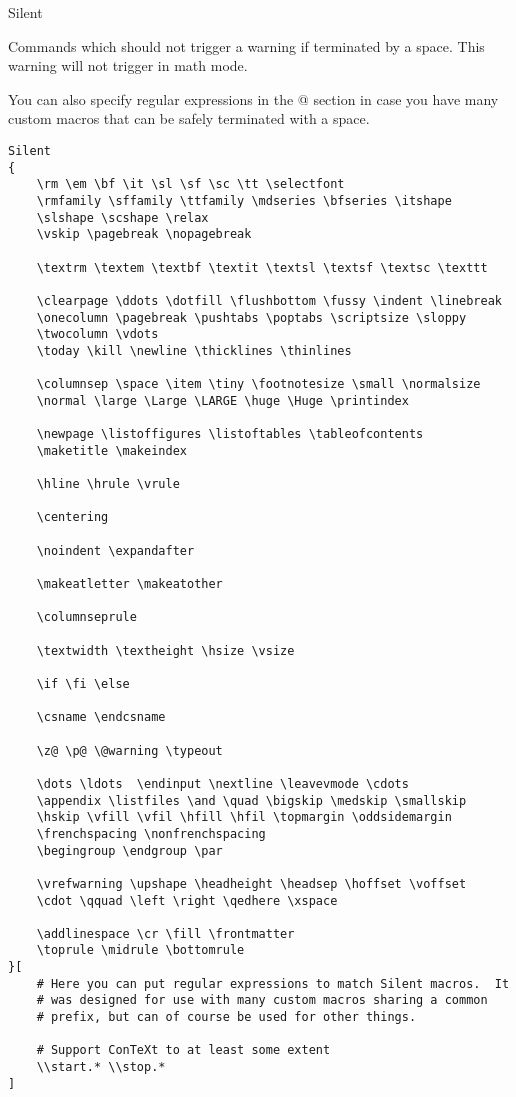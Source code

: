 \begin{chktexrclistvar*}{Silent}

Commands which should not trigger a warning if terminated by a space.
This warning will not trigger in math mode.

You can also specify regular expressions in the \verb@[]@
section in case you have many custom macros that can be safely
terminated with a space.

\chktexrcdefault\begin{verbatim}
Silent
{
    \rm \em \bf \it \sl \sf \sc \tt \selectfont
    \rmfamily \sffamily \ttfamily \mdseries \bfseries \itshape
    \slshape \scshape \relax
    \vskip \pagebreak \nopagebreak

    \textrm \textem \textbf \textit \textsl \textsf \textsc \texttt

    \clearpage \ddots \dotfill \flushbottom \fussy \indent \linebreak
    \onecolumn \pagebreak \pushtabs \poptabs \scriptsize \sloppy
    \twocolumn \vdots
    \today \kill \newline \thicklines \thinlines

    \columnsep \space \item \tiny \footnotesize \small \normalsize
    \normal \large \Large \LARGE \huge \Huge \printindex

    \newpage \listoffigures \listoftables \tableofcontents
    \maketitle \makeindex

    \hline \hrule \vrule

    \centering

    \noindent \expandafter

    \makeatletter \makeatother

    \columnseprule

    \textwidth \textheight \hsize \vsize

    \if \fi \else

    \csname \endcsname

    \z@ \p@ \@warning \typeout

    \dots \ldots  \endinput \nextline \leavevmode \cdots
    \appendix \listfiles \and \quad \bigskip \medskip \smallskip
    \hskip \vfill \vfil \hfill \hfil \topmargin \oddsidemargin
    \frenchspacing \nonfrenchspacing
    \begingroup \endgroup \par

    \vrefwarning \upshape \headheight \headsep \hoffset \voffset
    \cdot \qquad \left \right \qedhere \xspace

    \addlinespace \cr \fill \frontmatter
    \toprule \midrule \bottomrule
}[
    # Here you can put regular expressions to match Silent macros.  It
    # was designed for use with many custom macros sharing a common
    # prefix, but can of course be used for other things.

    # Support ConTeXt to at least some extent
    \\start.* \\stop.*
]
\end{verbatim}
\end{chktexrclistvar*}


